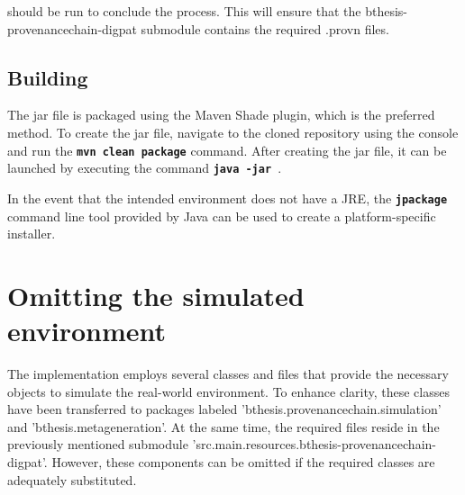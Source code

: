 \documentclass[
  digital,     %
  oneside,     %
  nosansbold,  %
  nocolorbold, %
  lof,         %
  lot,         %
]{fithesis4}
\begin{document}
should be run to conclude the process. This will ensure that the bthesis-provenancechain-digpat submodule contains the required .provn files.

\subsection{Building}
The jar file is packaged using the Maven Shade plugin, which is the preferred method. To create the jar file, navigate to the cloned repository using the console and run the \textbf{\texttt{mvn clean package}} command. After creating the jar file, it can be launched by executing the command \textbf{\texttt{java -jar }}.

In the event that the intended environment does not have a JRE, the \textbf{\texttt{jpackage}} command line tool provided by Java can be used to create a platform-specific installer.

\section{Omitting the simulated environment}
The implementation employs several classes and files that provide the necessary objects to simulate the real-world environment. To enhance clarity, these classes have been transferred to packages labeled 'bthesis.provenancechain.simulation' and 'bthesis.metageneration'. At the same time, the required files reside in the previously mentioned submodule 'src.main.resources.bthesis-provenancechain-digpat'. However, these components can be omitted if the required classes are adequately substituted.
\shorthandon{-}
\end{document}
